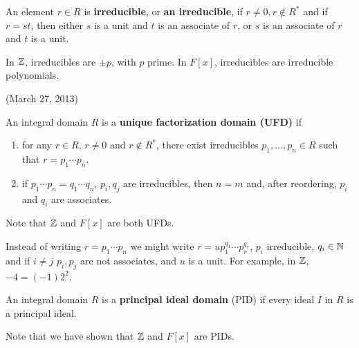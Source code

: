 \documentclass{../mathnotes}
\begin{document}
\begin{defn}
    An element $r\in R$ is \textbf{irreducible}, or \textbf{an irreducible}, if $r\neq 0, r\notin R^*$ and if $r=st$, then either $s$ is a unit and 
    $t$ is an associate of $r$, or $s$ is an associate of $r$ and $t$ is a unit.
\end{defn}
\begin{exmp}
    In $\mathbb{Z}$, irreducibles are $\pm p$, with $p$ prime. In $F[x]$, irreducibles are irreducible polynomials.
\end{exmp}

(March 27, 2013)

\begin{defn}
    An integral domain $R$ is a \textbf{unique factorization domain (UFD)} if
    \begin{enumerate}
        \item for any $r\in R$, $r\neq 0$ and $r\notin R^*$, there exist irreducibles $p_1,\ldots,p_n\in R$ such that $r=p_1\cdots p_n$.
        \item if $p_1\cdots p_n=q_1\cdots q_n$, $p_i,q_j$ are irreducibles, then $n=m$ and, after reordering, $p_i$ and $q_i$ are associates.
    \end{enumerate}
\end{defn}

Note that $\mathbb{Z}$ and $F[x]$ are both UFDs.

\begin{rem}
    Instead of writing $r=p_1\cdots p_n$ we might write $r=up_1^{q_1}\cdots p_r^{q_r}$, $p_i$ irreducible, $q_i\in\mathbb{N}$ and if $i\neq j$
    $p_i,p_j$ are not associates, and $u$ is a unit. For example, in $\mathbb{Z}$, $-4=(-1)2^2$.
\end{rem}

\begin{defn}
    An integral domain $R$ is a \textbf{principal ideal domain} (PID) if every ideal $I$ in $R$ is a principal ideal.
\end{defn}

Note that we have shown that $\mathbb{Z}$ and $F[x]$ are PIDs.
\end{document}
